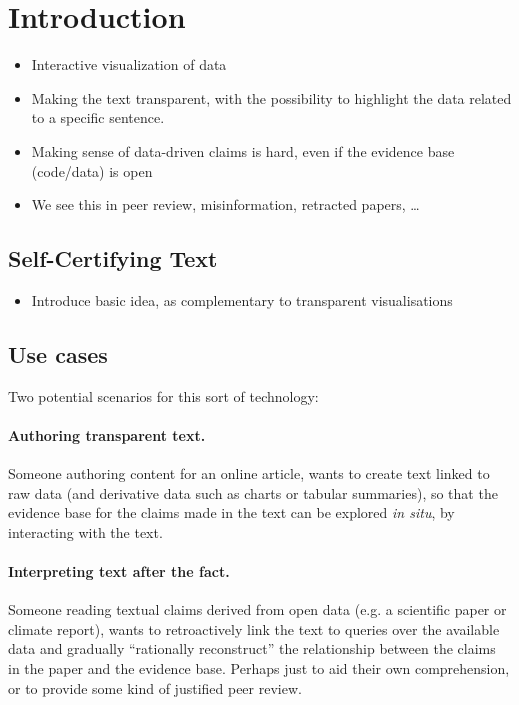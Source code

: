 \section{Introduction}

\lstset{
    aboveskip=-7pt,
    belowskip=-8.5pt,
    xleftmargin=0pt,
    xrightmargin=0pt
}

\begin{itemize}
    \item Interactive visualization of data
    \item Making the text transparent, with the possibility to highlight the data related to a specific sentence.
    \item Making sense of data-driven claims is hard, even if the evidence base (code/data) is open
    \item We see this in peer review, misinformation, retracted papers, …
\end{itemize}

\subsection{Self-Certifying Text}

\begin{itemize}
    \item Introduce basic idea, as complementary to transparent visualisations
\end{itemize}

\subsection{Use cases}
Two potential scenarios for this sort of technology:

\paragraph{Authoring transparent text.} Someone authoring content for an online article, wants to create text
linked to raw data (and derivative data such as charts or tabular summaries), so that the evidence base for
the claims made in the text can be explored \emph{in situ}, by interacting with the text.

\paragraph{Interpreting text after the fact.} Someone reading textual claims derived from open data (e.g. a
scientific paper or climate report), wants to retroactively link the text to queries over the available data
and gradually ``rationally reconstruct'' the relationship between the claims in the paper and the evidence
base. Perhaps just to aid their own comprehension, or to provide some kind of justified peer review.

